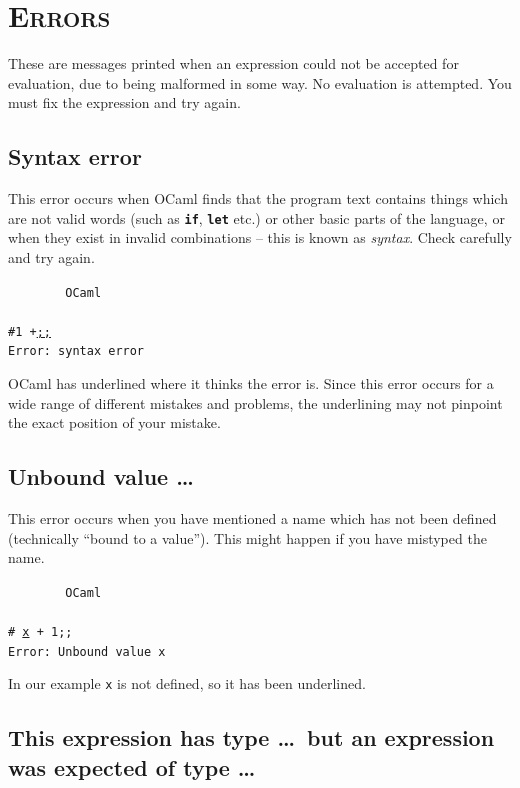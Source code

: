 \documentclass[]{book}
\newcommand{\plet}{\textbf{let}\xspace}
\newcommand{\pif}{\textbf{if}\xspace}
\newcommand{\smspace}{\vspace{4mm}}
\begin{document}
\section*{\scshape Errors}

These are messages printed when an expression could not be accepted for evaluation, due to being malformed in some way. No evaluation is attempted. You must fix the expression and try again.

\subsection*{Syntax error}

This error occurs when OCaml finds that the program text contains things which are not valid words (such as \texttt{\pif}, \texttt{\plet} etc.) or other basic parts of the language, or when they exist in invalid combinations -- this is known as \textit{syntax}. Check carefully and try again.

\smspace
\noindent\verb!        OCaml!\\
\noindent\\
\noindent\texttt{\#1 +\underline{;;}}\\
\noindent\verb!Error: syntax error!
\smspace

\noindent OCaml has underlined where it thinks the error is. Since this error occurs for a wide range of different mistakes and problems, the underlining may not pinpoint the exact position of your mistake.

\subsection*{Unbound value \ldots}

This error occurs when you have mentioned a name which has not been defined (technically ``bound to a value''). This might happen if you have mistyped the name.

\smspace
\noindent\verb!        OCaml!\\
\noindent\\
\texttt{\# \underline{x} + 1;;}\\
\texttt{Error:\ Unbound value x}
\smspace

\noindent In our example \texttt{x} is not defined, so it has been underlined.

\subsection*{This expression has type \ldots\ but an expression was expected of type \ldots}
\end{document}
